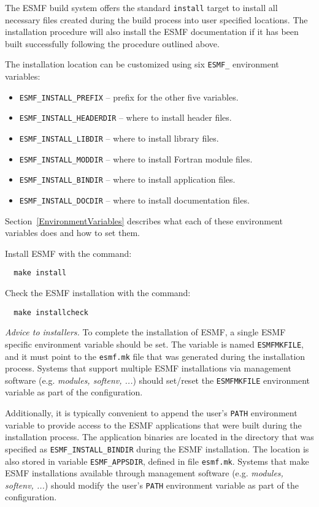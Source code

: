 The ESMF build system offers the standard {\tt install} target to install all
necessary files created during the build process into user specified locations.
The installation procedure will also install the ESMF documentation if it has
been built successfully following the procedure outlined above.

The installation location can be customized using six {\tt ESMF\_} environment
variables:
\begin{itemize}
\item {\tt ESMF\_INSTALL\_PREFIX} -- prefix for the other five variables.
\item {\tt ESMF\_INSTALL\_HEADERDIR} -- where to install header files.
\item {\tt ESMF\_INSTALL\_LIBDIR} -- where to install library files.
\item {\tt ESMF\_INSTALL\_MODDIR} -- where to install Fortran module files.
\item {\tt ESMF\_INSTALL\_BINDIR} -- where to install application files.
\item {\tt ESMF\_INSTALL\_DOCDIR} -- where to install documentation files.
\end{itemize}

Section~\ref{EnvironmentVariables} describes what each of these
environment variables does and how to set them.

Install ESMF with the command:
\begin{verbatim}
  make install
\end{verbatim}

Check the ESMF installation with the command:
\begin{verbatim}
  make installcheck
\end{verbatim}

{\em Advice to installers.} To complete the installation of ESMF, a single ESMF specific environment variable should be set. The variable is named {\tt ESMFMKFILE}, and it must point to the {\tt esmf.mk} file that was generated during the installation process. Systems that support multiple ESMF installations via management software (e.g. {\em modules, softenv, ...}) should set/reset the {\tt ESMFMKFILE} environment variable as part of the configuration.

Additionally, it is typically convenient to append the user's {\tt PATH} environment variable to provide access to the ESMF applications that were built during the installation process. The application binaries are located in the directory that was specified as {\tt ESMF\_INSTALL\_BINDIR} during the ESMF installation. The location is also stored in variable {\tt ESMF\_APPSDIR}, defined in file {\tt esmf.mk}. Systems that make ESMF installations available through management software (e.g. {\em modules, softenv, ...}) should modify the user's {\tt PATH} environment variable as part of the configuration.

